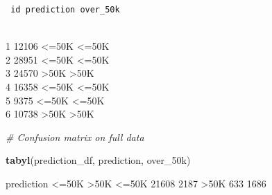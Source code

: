 \documentclass[]{article}
\newenvironment{Shaded}{\begin{snugshade}}{\end{snugshade}}
\newcommand{\CommentTok}[1]{\textcolor[rgb]{0.56,0.35,0.01}{\textit{#1}}}
\newcommand{\KeywordTok}[1]{\textcolor[rgb]{0.13,0.29,0.53}{\textbf{#1}}}
\newcommand{\NormalTok}[1]{#1}
\newcommand{\OperatorTok}[1]{\textcolor[rgb]{0.81,0.36,0.00}{\textbf{#1}}}
\newcommand{\StringTok}[1]{\textcolor[rgb]{0.31,0.60,0.02}{#1}}
\begin{document}
\begin{verbatim}
 id prediction over_50k
\end{verbatim}

\\
1 12106 \textless{}=50K \textless{}=50K\\
2 28951 \textless{}=50K \textless{}=50K\\
3 24570 \textgreater{}50K \textgreater{}50K\\
4 16358 \textless{}=50K \textless{}=50K\\
5 9375 \textless{}=50K \textless{}=50K\\
6 10738 \textgreater{}50K \textgreater{}50K

\begin{Shaded}
\begin{Highlighting}[]
\CommentTok{# Confusion matrix on full data}

\KeywordTok{tabyl}\NormalTok{(prediction_df, prediction, over_50k)}
\end{Highlighting}
\end{Shaded}

prediction \textless{}=50K \textgreater{}50K \textless{}=50K 21608 2187
\textgreater{}50K 633 1686

\begin{Shaded}
\end{Shaded}
\end{document}
